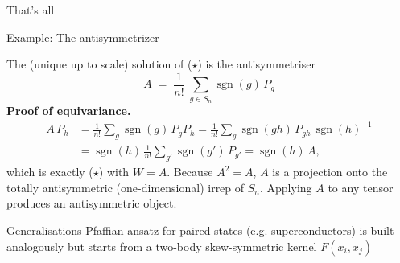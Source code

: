 \documentclass[aspectratio=64,8pt]{beamer}
\begin{document}


\begin{frame}{}
  \centering \Huge That's all
\end{frame}



\begin{frame}{Example: The antisymmetrizer}
    \begin{tcolorbox}[title=\textbf{Intertwiner (Weiler \& Cohen 2019)},colback=blue!5!white]
      \footnotesize    
      The (unique up to scale) solution of ($\star$) is the antisymmetriser
          $$
          \boxed{\;
          A \;=\; \frac{1}{n!}\;\sum_{g\in S_n}\!\operatorname{sgn}(g)\,P_g
          \;
          }
          $$
          \textbf{Proof of equivariance.}
          $$
          \begin{aligned}
          A\,P_h
          &=\frac{1}{n!}\sum_{g}\operatorname{sgn}(g)\,P_gP_h
          =\frac{1}{n!}\sum_{g}\operatorname{sgn}(gh)\,P_{gh}\,\operatorname{sgn}(h)^{-1}\\[2mm]
          &=\operatorname{sgn}(h)\,\frac{1}{n!}\sum_{g'}\operatorname{sgn}(g')\,P_{g'}
          =\operatorname{sgn}(h)\,A ,
          \end{aligned}
          $$
          which is exactly ($\star$) with $W=A$.
          Because $A^2=A$, $A$ is a projection onto the totally antisymmetric (one-dimensional) irrep of $S_n$. 
          Applying $A$ to any tensor produces an antisymmetric object.
          
          Generalisations
          Pfaffian ansatz for paired states (e.g. superconductors) is built analogously but starts from a two-body skew-symmetric kernel $F(x_i,x_j)$
    \end{tcolorbox}

\end{frame}
\end{document}
